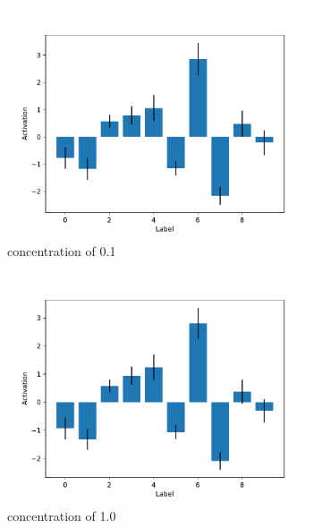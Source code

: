 \documentclass{article}
\begin{document}
\begin{figure}
  \centering
  \begin{subfigure}[b]{0.32\textwidth}
    \centering
    \includegraphics[width=\textwidth]{images/noise_activations_by_label_0.1.pdf}
    \caption{concentration of 0.1}
    \label{fig:noise_activations_0.1}
  \end{subfigure}
  \hfill
  \begin{subfigure}[b]{0.32\textwidth}
    \centering
    \includegraphics[width=\textwidth]{images/noise_activations_by_label_1.0.pdf}
    \caption{concentration of 1.0}
    \label{fig:noise_activations_1.0}
  \end{subfigure}
  \hfill
  \begin{subfigure}[b]{0.32\textwidth}

\end{subfigure}
\end{figure}
\end{document}

